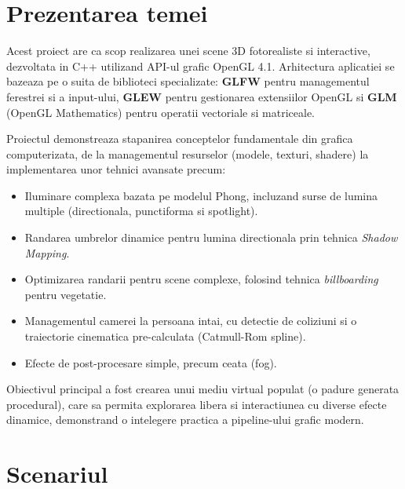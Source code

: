 \documentclass[11pt,a4paper]{article}
\begin{document}
\cleardoublepage
{}

\section{Prezentarea temei}
Acest proiect are ca scop realizarea unei scene 3D fotorealiste si interactive, dezvoltata in C++ utilizand API-ul grafic OpenGL 4.1. Arhitectura aplicatiei se bazeaza pe o suita de biblioteci specializate: \textbf{GLFW} pentru managementul ferestrei si a input-ului, \textbf{GLEW} pentru gestionarea extensiilor OpenGL si \textbf{GLM} (OpenGL Mathematics) pentru operatii vectoriale si matriceale.

Proiectul demonstreaza stapanirea conceptelor fundamentale din grafica computerizata, de la managementul resurselor (modele, texturi, shadere) la implementarea unor tehnici avansate precum:
\begin{itemize}
    \item Iluminare complexa bazata pe modelul Phong, incluzand surse de lumina multiple (directionala, punctiforma si spotlight).
    \item Randarea umbrelor dinamice pentru lumina directionala prin tehnica \textit{Shadow Mapping}.
    \item Optimizarea randarii pentru scene complexe, folosind tehnica \textit{billboarding} pentru vegetatie.
    \item Managementul camerei la persoana intai, cu detectie de coliziuni si o traiectorie cinematica pre-calculata (Catmull-Rom spline).
    \item Efecte de post-procesare simple, precum ceata (fog).
\end{itemize}

Obiectivul principal a fost crearea unui mediu virtual populat (o padure generata procedural), care sa permita explorarea libera si interactiunea cu diverse efecte dinamice, demonstrand o intelegere practica a pipeline-ului grafic modern.

\section{Scenariul}
\end{document}
